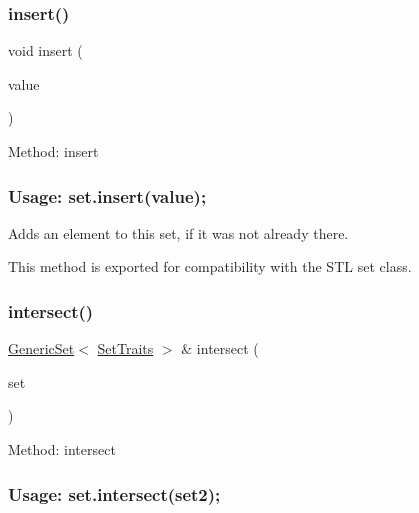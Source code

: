 \subsubsection{\texorpdfstring{insert()}{insert()}}
{\footnotesize\ttfamily void insert (\begin{DoxyParamCaption}\item[{const \mbox{\hyperlink{classstanfordcpplib_1_1collections_1_1GenericSet_a669c81f158766925e7293f97c0099b28}{value\+\_\+type}} \&}]{value }\end{DoxyParamCaption})}



Method\+: insert \subsubsection*{Usage\+: set.\+insert(value); }

Adds an element to this set, if it was not already there. 

This method is exported for compatibility with the S\+TL {\ttfamily set} class. \mbox{\label{classstanfordcpplib_1_1collections_1_1GenericSet_a1892695645d8f29cbc6c8587500f2829}} 
\subsubsection{\texorpdfstring{intersect()}{intersect()}}
{\footnotesize\ttfamily \mbox{\hyperlink{classstanfordcpplib_1_1collections_1_1GenericSet}{Generic\+Set}}$<$ \mbox{\hyperlink{structstanfordcpplib_1_1collections_1_1SetTraits}{Set\+Traits}} $>$ \& intersect (\begin{DoxyParamCaption}\item[{const \mbox{\hyperlink{classstanfordcpplib_1_1collections_1_1GenericSet}{Generic\+Set}}$<$ \mbox{\hyperlink{structstanfordcpplib_1_1collections_1_1SetTraits}{Set\+Traits}} $>$ \&}]{set }\end{DoxyParamCaption})}



Method\+: intersect \subsubsection*{Usage\+: set.\+intersect(set2); }

